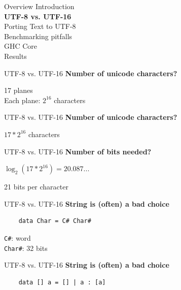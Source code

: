 \documentclass[20pt]{beamer}
\newcommand{\vspaced}{
    \vspace{5mm}
}
\begin{document}

\begin{frame}{Overview}
    Introduction \\
    \textbf{UTF-8 vs. UTF-16} \\
    Porting Text to UTF-8 \\
    Benchmarking pitfalls \\
    GHC Core \\
    Results
\end{frame}

\begin{frame}{UTF-8 vs. UTF-16}
    \textbf{Number of unicode characters?} \\
    \vspaced
    17 planes \\
    Each plane: $2^{16}$ characters \\
\end{frame}

\begin{frame}{UTF-8 vs. UTF-16}
    \textbf{Number of unicode characters?} \\
    \vspaced
    $17 * 2^{16}$ characters \\
\end{frame}

\begin{frame}{UTF-8 vs. UTF-16}
    \textbf{Number of bits needed?} \\
    \vspaced
    $\log_2(17 * 2^{16}) = 20.087...$ \\
    \vspaced
    21 bits per character \\
\end{frame}

\begin{frame}[fragile]{UTF-8 vs. UTF-16}
    \textbf{String is (often) a bad choice} \\
    \vspaced
    \begin{lstlisting}
    data Char = C# Char#
    \end{lstlisting}
    \texttt{C\#}: word \\
    \texttt{Char\#}: 32 bits \\
\end{frame}

\begin{frame}[fragile]{UTF-8 vs. UTF-16}
    \textbf{String is (often) a bad choice} \\
    \vspaced
    \begin{lstlisting}
    data [] a = [] | a : [a]
    \end{lstlisting}
\end{frame}
\end{document}
